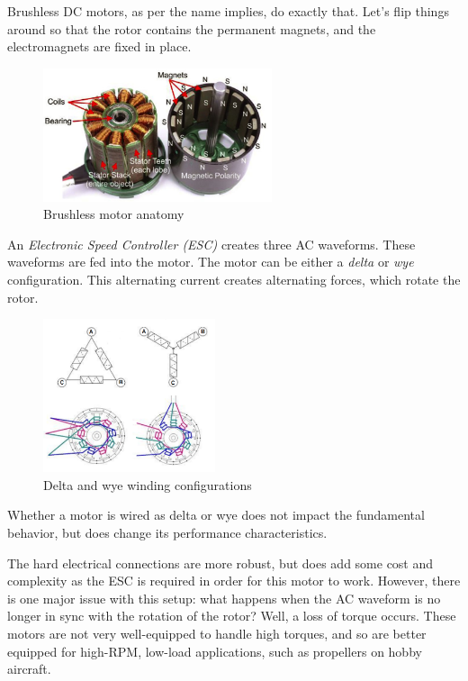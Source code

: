 Brushless DC motors, as per the name implies, do exactly that. Let's flip things around so that the rotor contains the permanent magnets, and the electromagnets are fixed in place.
\begin{figure}[H]\centering
\includegraphics[width=0.6\textwidth]{imgs/img_Mechatronics_Motors_brushless.png}
\caption{Brushless motor anatomy}
\end{figure}

An \textit{Electronic Speed Controller (ESC)} creates three AC waveforms. These waveforms are fed into the motor. The motor can be either a \textit{delta} or \textit{wye} configuration. This alternating current creates alternating forces, which rotate the rotor.

\begin{figure}[H]
	\includegraphics[width=0.45\textwidth]{imgs/delta_wye.png}
	\caption{Delta and wye winding configurations}
\end{figure}

Whether a motor is wired as delta or wye does not impact the fundamental behavior, but does change its performance characteristics.

The hard electrical connections are more robust, but does add some cost and complexity as the ESC is required in order for this motor to work. However, there is one major issue with this setup: what happens when the AC waveform is no longer in sync with the rotation of the rotor? Well, a loss of torque occurs. These motors are not very well-equipped to handle high torques, and so are better equipped for high-RPM, low-load applications, such as propellers on hobby aircraft.

